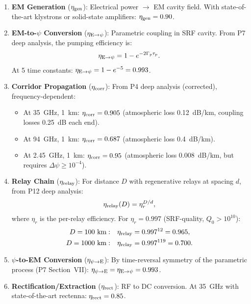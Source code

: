 \documentclass[aps,prd,twocolumn,superscriptaddress]{revtex4-2}
\begin{document}
\begin{enumerate}
\item \textbf{EM Generation} ($\eta_{\rm gen}$): Electrical power
$\to$ EM cavity field.  With state-of-the-art klystrons or solid-state
amplifiers: $\eta_{\rm gen} = 0.90$.

\item \textbf{EM-to-$\psi$ Conversion} ($\eta_{\rm E\to\psi}$):
Parametric coupling in SRF cavity.  From P7 deep analysis, the pumping
efficiency is:
\begin{equation}
\eta_{\rm E\to\psi} = 1 - e^{-2\Gamma_p \tau_p}.
\end{equation}
At 5 time constants: $\eta_{\rm E\to\psi} = 1 - e^{-5} = 0.993$.

\item \textbf{Corridor Propagation} ($\eta_{\rm corr}$): From P4 deep
analysis (corrected), frequency-dependent:
\begin{itemize}
\item At 35~GHz, 1~km: $\eta_{\rm corr} = 0.905$ (atmospheric loss
0.12~dB/km, coupling losses 0.25~dB each end).
\item At 94~GHz, 1~km: $\eta_{\rm corr} = 0.687$ (atmospheric loss
0.4~dB/km).
\item At 2.45~GHz, 1~km: $\eta_{\rm corr} = 0.95$ (atmospheric loss
0.008~dB/km, but requires $\Delta\psi \geq 10^{-4}$).
\end{itemize}

\item \textbf{Relay Chain} ($\eta_{\rm relay}$): For distance $D$ with
regenerative relays at spacing $d$, from P12 deep analysis:
\begin{equation}
\eta_{\rm relay}(D) = \eta_r^{D/d},
\end{equation}
where $\eta_r$ is the per-relay efficiency.  For $\eta_r = 0.997$
(SRF-quality, $Q_0 > 10^{10}$):
\begin{align}
D = 100~\text{km}: &\quad \eta_{\rm relay} = 0.997^{12} = 0.965, \\
D = 1000~\text{km}: &\quad \eta_{\rm relay} = 0.997^{119} = 0.700.
\end{align}

\item \textbf{$\psi$-to-EM Conversion} ($\eta_{\psi\to\rm E}$):
By time-reversal symmetry of the parametric process (P7 Section~VII):
$\eta_{\psi\to\rm E} = \eta_{\rm E\to\psi} = 0.993$.

\item \textbf{Rectification/Extraction} ($\eta_{\rm rect}$): RF to DC
conversion.  At 35~GHz with state-of-the-art rectenna:
$\eta_{\rm rect} = 0.85$.
\end{enumerate}
\end{document}
